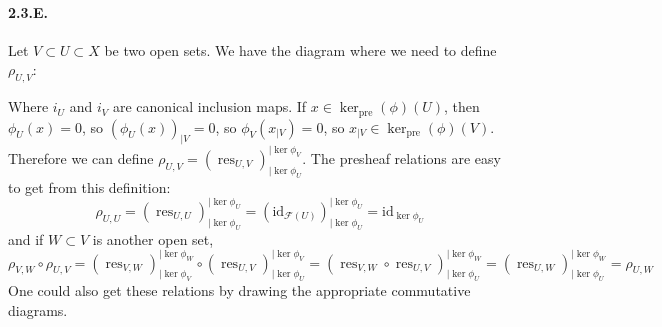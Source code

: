 \documentclass{article}
\newcommand{\id}{\mathrm{id}}
\newcommand{\pre}{\mathrm{pre}}
\DeclareMathOperator{\res}{res}
\newcommand{\Fsheaf}{\mathscr{F}}
\newcommand{\Gsheaf}{\mathscr{G}}
\begin{document}
\paragraph{2.3.E.} Let $V \subset U \subset X$ be two open sets. We have the diagram where we need to define $\rho_{U,V}$:
\begin{center}
\end{center}
Where $i_U$ and $i_V$ are canonical inclusion maps. If $x \in \ker_{\pre}(\phi)(U)$, then $\phi_U(x) = 0$, so $(\phi_U(x))_{\mid V} = 0$, so $\phi_V(x_{\mid V}) = 0$, so $x_{\mid V} \in \ker_{\pre}(\phi)(V)$. Therefore we can define $\rho_{U,V} = (\res_{U,V})_{\mid \ker \phi_U}^{\mid \ker \phi_V}$. The presheaf relations are easy to get from this definition:
\[\rho_{U,U} = (\res_{U,U})_{\mid \ker \phi_U}^{\mid \ker \phi_U} = (\id_{\Fsheaf(U)})_{\mid \ker \phi_U}^{\mid \ker \phi_U} = \id_{\ker \phi_U}\]
and if $W \subset V$ is another open set,
\[\rho_{V,W} \circ \rho_{U,V} = (\res_{V,W})_{\mid \ker \phi_V}^{\mid \ker \phi_W} \circ (\res_{U,V})_{\mid \ker \phi_U}^{\mid \ker \phi_V} = (\res_{V,W} \circ \res_{U,V})_{\mid \ker \phi_U}^{\mid \ker \phi_W} = (\res_{U,W})_{\mid \ker \phi_U}^{\mid \ker \phi_W} =\rho_{U,W}\]
One could also get these relations by drawing the appropriate commutative diagrams.
\end{document}
